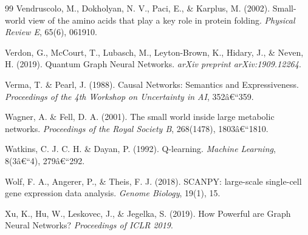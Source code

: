 ﻿\documentclass[12pt,a4paper,twoside]{article}
\theoremstyle{definition}
\theoremstyle{plain}
\theoremstyle{remark}
\begin{document}
\begin{thebibliography}{99}
  Vendruscolo, M., Dokholyan, N. V., Paci, E., \& Karplus, M. (2002).
  Small-world view of the amino acids that play a key role in protein
  folding.
  \textit{Physical Review E}, 65(6), 061910.

  Verdon, G., McCourt, T., Lubasch, M., Leyton-Brown, K.,
  Hidary, J., \& Neven, H. (2019).
  Quantum Graph Neural Networks.
  \textit{arXiv preprint arXiv:1909.12264}.

  Verma, T. \& Pearl, J. (1988).
  Causal Networks: Semantics and Expressiveness.
  \textit{Proceedings of the 4th Workshop on Uncertainty in AI}, 352â€“359.

  Wagner, A. \& Fell, D. A. (2001).
  The small world inside large metabolic networks.
  \textit{Proceedings of the Royal Society B}, 268(1478), 1803â€“1810.

  Watkins, C. J. C. H. \& Dayan, P. (1992).
  Q-learning.
  \textit{Machine Learning}, 8(3â€“4), 279â€“292.

  Wolf, F. A., Angerer, P., \& Theis, F. J. (2018).
  SCANPY: large-scale single-cell gene expression data analysis.
  \textit{Genome Biology}, 19(1), 15.

  Xu, K., Hu, W., Leskovec, J., \& Jegelka, S. (2019).
  How Powerful are Graph Neural Networks?
  \textit{Proceedings of ICLR 2019}.

\end{thebibliography}

\end{document}
